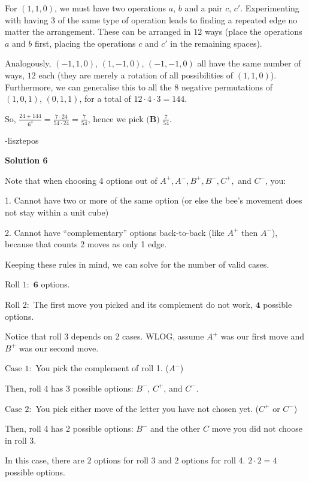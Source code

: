 \begin{enumerate}
 For $(1,1,0)$, we must have two operations $a$, $b$ and a pair $c$, $c'$. Experimenting with having $3$ of the same type of operation leads to finding a repeated edge no matter the arrangement. These can be arranged in $12$ ways (place the operations $a$ and $b$ first, placing the operations $c$ and $c'$ in the remaining spaces).

 Analogously, $(-1,1,0)$, $(1,-1,0)$, $(-1,-1,0)$ all have the same number of ways, $12$ each (they are merely a rotation of all possibilities of $(1,1,0)$). Furthermore, we can generalise this to all the $8$ negative permutations of $(1,0,1)$, $(0,1,1)$, for a total of $12\cdot4\cdot3=144$. 

 So, $\frac{24+144}{6^4}=\frac{7\cdot24}{54\cdot24}=\frac{7}{54}$, hence we pick $\boxed{\textbf{(B) }\frac{7}{54}}$.

 -lisztepos

 



\textbf{Solution 6}

Note that when choosing 4 options out of $A^+, A^-, B^+, B^-, C^+,$ and $C^-$, you:

 1. Cannot have two or more of the same option (or else the bee’s movement does not stay within a unit cube)

 2. Cannot have “complementary” options back-to-back (like $A^+$ then $A^-$), because that counts 2 moves as only 1 edge.

 
Keeping these rules in mind, we can solve for the number of valid cases.

 $\boxed{\text{Roll 1}:}$ $\textbf{6}$ options.

 $\boxed{\text{Roll 2}:}$ The first move you picked and its complement do not work, $\textbf{4}$ possible options.

 
Notice that roll 3 depends on 2 cases. WLOG, assume $A^+$ was our first move and $B^+$ was our second move.

 $\boxed{\text{Case 1}:}$ You pick the complement of roll 1. ($A^-$)

 Then, roll 4 has 3 possible options: $B^-$, $C^+$, and $C^-$.

 $\boxed{\text{Case 2}:}$ You pick either move of the letter you have not chosen yet. ($C^+$ or $C^-$)

 Then, roll 4 has 2 possible options: $B^-$ and the other $C$ move you did not choose in roll 3.

 In this case, there are $2$ options for roll 3 and $2$ options for roll 4. $2 \cdot 2 = 4$ possible options.


\end{enumerate}
